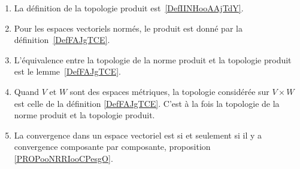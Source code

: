 
       \label{THEMEooYRIWooDXZnhX}
\begin{enumerate}
	\item
	      La définition de la topologie produit est~\ref{DefIINHooAAjTdY}.
	\item
	      Pour les espaces vectoriels normés, le produit est donné par la définition~\ref{DefFAJgTCE}.
	\item
	      L'équivalence entre la topologie de la norme produit et la topologie produit est le lemme~\ref{DefFAJgTCE}.
	\item
	      Quand \( V\) et \( W\) sont des espaces métriques, la topologie considérée sur \( V\times W\) est celle de la définition \ref{DefFAJgTCE}. C'est à la fois la topologie de la norme produit et la topologie produit.
	\item
	      La convergence dans un espace vectoriel est si et seulement si il y a convergence composante par composante, proposition \ref{PROPooNRRIooCPesgO}.
\end{enumerate}

